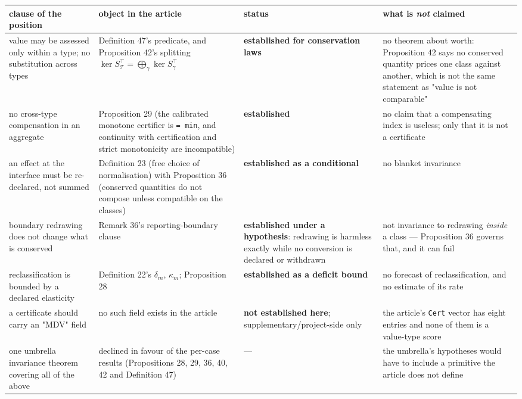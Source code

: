\documentclass[11pt]{article}
\begin{document}
\begin{longtable}{@{}p{50mm}|p{50mm}|p{50mm}|p{50mm}@{}}
\toprule
clause of the position & object in the article & status & what is \emph{not} claimed \\
\midrule
value may be assessed only within a type; no substitution across types & Definition 47's predicate, and Proposition 42's splitting \(\ker S_{\mathcal T}^{\top} = \bigoplus_\gamma \ker S_\gamma^{\top}\) & \textbf{established for conservation laws} & no theorem about worth: Proposition 42 says no conserved quantity prices one class against another, which is not the same statement as "value is not comparable" \\
no cross-type compensation in an aggregate & Proposition 29 (the calibrated monotone certifier is \texttt{= min}, and continuity with certification and strict monotonicity are incompatible) & \textbf{established} & no claim that a compensating index is useless; only that it is not a certificate \\
an effect at the interface must be re-declared, not summed & Definition 23 (free choice of normalisation) with Proposition 36 (conserved quantities do not compose unless compatible on the classes) & \textbf{established as a conditional} & no blanket invariance \\
boundary redrawing does not change what is conserved & Remark 36's reporting-boundary clause & \textbf{established under a hypothesis}: redrawing is harmless exactly while no conversion is declared or withdrawn & not invariance to redrawing \emph{inside} a class --- Proposition 36 governs that, and it can fail \\
reclassification is bounded by a declared elasticity & Definition 22's \(\delta_m\), \(\kappa_m\); Proposition 28 & \textbf{established as a deficit bound} & no forecast of reclassification, and no estimate of its rate \\
a certificate should carry an "MDV" field & no such field exists in the article & \textbf{not established here}; supplementary/project-side only & the article's \texttt{Cert} vector has eight entries and none of them is a value-type score \\
one umbrella invariance theorem covering all of the above & declined in favour of the per-case results (Propositions 28, 29, 36, 40, 42 and Definition 47) & --- & the umbrella's hypotheses would have to include a primitive the article does not define \\
\bottomrule
\end{longtable}
\end{document}
